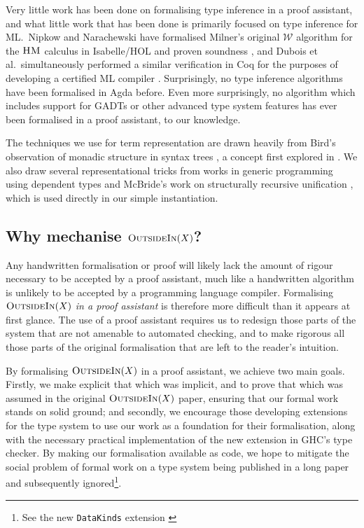 \documentclass[a4paper]{jfp}
\newcommand{\outsidein}{\textsc{OutsideIn}(X)}
\begin{document}
Very little work has been done on formalising type inference in a proof assistant, and what little work that has been done is primarily focused on
type inference for ML.\ Nipkow and Narachewski have formalised Milner's original $\mathcal{W}$ algorithm for the $\textsc{HM}$ calculus in Isabelle/HOL
and proven soundness \cite{Naraschewski:1999:TIV:594135.594270}, and Dubois et al.\ simultaneously performed a similar verification in Coq
\cite{Dubois99certificationof} for the purposes of developing a certified ML compiler \cite{Dubois00provingml}. Surprisingly, no type inference
algorithms have been formalised in Agda before. Even more surprisingly, no algorithm which includes support for GADTs or other advanced type system
features has ever been formalised in a proof assistant, to our knowledge.

The techniques we use for term representation are drawn heavily from Bird's observation of monadic structure in syntax trees
\cite{Bird:1999:DBN:968699.968702}, a concept first explored in \cite{Bellegarde:1994:SFM:202774.202788}. We also draw several representational tricks
from works in generic programming using dependent types \cite{Morris04exploringthe} and McBride's work on structurally recursive unification
\cite{McBride:2003bg}, which is used directly in our simple instantiation. 


\subsection{Why mechanise $\outsidein$?}

Any handwritten formalisation or proof will likely lack the amount of rigour necessary to be accepted by a proof assistant, much like a handwritten
algorithm is unlikely to be accepted by a programming language compiler. Formalising $\outsidein$ \emph{in a proof assistant} is therefore more
difficult than it appears at first glance. The use of a proof assistant requires us to redesign those parts of the system that are not amenable to
automated checking, and to make rigorous all those parts of the original formalisation that are left to the reader's intuition.

By formalising $\outsidein$ in a proof assistant, we achieve two main goals. Firstly, we make explicit that which was implicit, and to prove that
which was assumed in the original $\outsidein$ paper, ensuring that our formal work stands on solid ground; and secondly, we encourage those
developing extensions for the type system to use our work as a foundation for their formalisation, along with the necessary practical implementation
of the new extension in GHC's type checker. By making our formalisation available as code, we hope to mitigate the social problem of formal work on a
type system being published in a long paper and subsequently ignored\footnote{See the new {\tt DataKinds} extension
   \cite{Yorgey:2012:GHP:2103786.2103795} }. 
\end{document}
